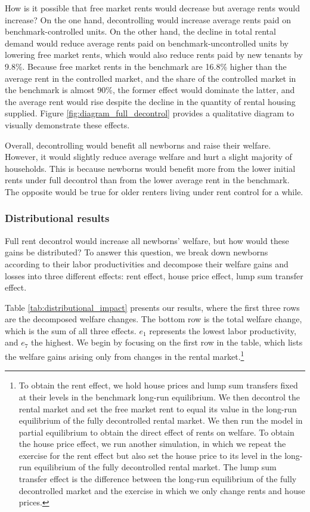 \documentclass[parskip=full]{article}
\begin{document}
How is it possible that free market rents would decrease but average rents would increase? On the one hand, decontrolling would increase average rents paid on benchmark-controlled units. On the other hand, the decline in total rental demand would reduce average rents paid on benchmark-uncontrolled units by lowering free market rents, which would also reduce rents paid by new tenants by 9.8\%. Because free market rents in the benchmark are 16.8\% higher than the average rent in the controlled market, and the share of the controlled market in the benchmark is almost 90\%, the former effect would dominate the latter, and the average rent would rise despite the decline in the quantity of rental housing supplied. Figure \ref{fig:diagram_full_decontrol} provides a qualitative diagram to visually demonstrate these effects. %

Overall, decontrolling would benefit all newborns and raise their welfare. However, it would slightly reduce average welfare and hurt a slight majority of households. This is because newborns would benefit more from the lower initial rents under full decontrol than from the lower average rent in the benchmark. The opposite would be true for older renters living under rent control for a while. 

\subsubsection{Distributional results} 

Full rent decontrol would increase all newborns' welfare, but how would these gains be distributed? To answer this question, we break down newborns according to their labor productivities and decompose their welfare gains and losses into three different effects: rent effect, house price effect, lump sum transfer effect. 

Table \ref{tab:distributional_impact} presents our results, where the first three rows are the decomposed welfare changes. The bottom row is the total welfare change, which is the sum of all three effects. $e_{1}$ represents the lowest labor productivity, and $e_{7}$ the highest. We begin by focusing on the first row in the table, which lists the welfare gains arising only from changes in the rental market.\footnote{To obtain the rent effect, we hold house prices and lump sum transfers fixed at their levels in the benchmark long-run equilibrium. We then decontrol the rental market and set the free market rent to equal its value in the long-run equilibrium of the fully decontrolled rental market. We then run the model in partial equilibrium to obtain the direct effect of rents on welfare. To obtain the house price effect, we run another simulation, in which we repeat the exercise for the rent effect but also set the house price to its level in the long-run equilibrium of the fully decontrolled rental market. The lump sum transfer effect is the difference between the long-run equilibrium of the fully decontrolled market and the exercise in which we only change rents and house prices.} 
\end{document}
